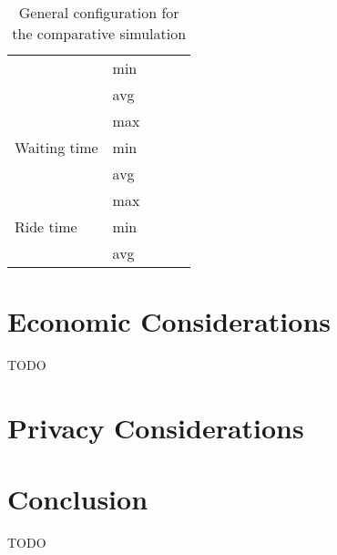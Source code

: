 \begin{table}[]
\begin{table}[]
\begin{tabular}{llrrr}
                                      & min &                      &                      &                      \\
                                      & avg &                      &                      &                      \\
\multirow{3}{*}{Waiting time}         & max &                      &                      &                      \\
                                      & min & \multicolumn{1}{l}{} & \multicolumn{1}{l}{} & \multicolumn{1}{l}{} \\
                                      & avg & \multicolumn{1}{l}{} & \multicolumn{1}{l}{} & \multicolumn{1}{l}{} \\
\multirow{3}{*}{Ride time}            & max & \multicolumn{1}{l}{} & \multicolumn{1}{l}{} & \multicolumn{1}{l}{} \\
                                      & min & \multicolumn{1}{l}{} & \multicolumn{1}{l}{} & \multicolumn{1}{l}{} \\
                                      & avg & \multicolumn{1}{l}{} & \multicolumn{1}{l}{} & \multicolumn{1}{l}{}
\end{tabular}
\end{table}
\caption{\label{tab:design:simulationconfig} General configuration for the comparative simulation}
\end{table}

\section{Economic Considerations}
TODO

\section{Privacy Considerations}

\section{Conclusion}
TODO